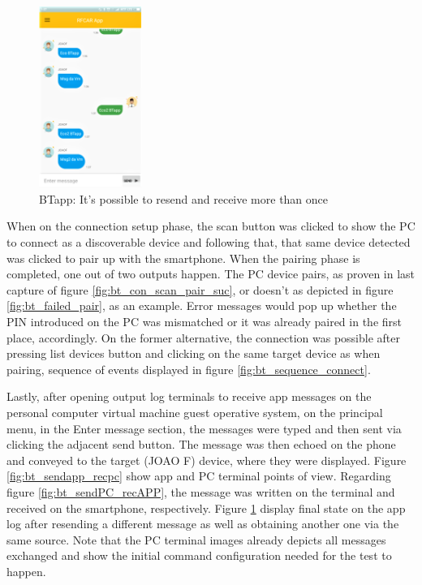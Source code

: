 %
\begin{figure}[!hbt]
\centering
\includegraphics[width=0.3\textwidth]{img/bt_resending_rereceiving.png}
\caption{\label{fig:bt_resending_rereceiving}BTapp: It's possible to resend and receive more than once}
\end{figure}
%
When on the connection setup phase, the scan button was clicked to show the PC to connect as a discoverable device and following that, that same device detected was clicked to pair up with the smartphone. When the pairing phase is completed, one out of two outputs happen. The PC device pairs, as proven in last capture of figure \ref{fig:bt_con_scan_pair_suc}, or doesn't as depicted in figure \ref{fig:bt_failed_pair}, as an example. Error messages would pop up whether the PIN introduced on the PC was mismatched or it was already paired in the first place, accordingly. On the former alternative, the connection was possible after pressing list devices button and clicking on the same target device as when pairing, sequence of events displayed in figure \ref{fig:bt_sequence_connect}.

Lastly, after opening output log terminals to receive app messages on the personal computer virtual machine guest operative system, on the principal menu, in the Enter message section, the messages were typed and then sent via clicking the adjacent send button. The message was then echoed on the phone and conveyed to the target (JOAO F) device, where they were displayed. Figure \ref{fig:bt_sendapp_recpc} show app and PC terminal points of view. Regarding figure \ref{fig:bt_sendPC_recAPP}, the message was written on the terminal and received on the smartphone, respectively. Figure \ref{fig:bt_resending_rereceiving} display final state on the app log after resending a different message as well as obtaining another one via the same source. Note that the PC terminal images already depicts all messages exchanged and show the initial command configuration needed for the test to happen.

